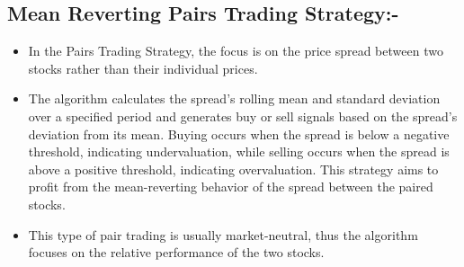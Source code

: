 \documentclass[11pt]{article}
\begin{document}
\subsection{Mean Reverting Pairs Trading Strategy:-}
\begin{itemize}
    \item In the Pairs Trading Strategy, the focus is on the price spread between two stocks rather than their individual prices.
    \item The algorithm calculates the spread's rolling mean and standard deviation over a specified period and generates buy or sell signals based on the spread's deviation from its mean. Buying occurs when the spread is below a negative threshold, indicating undervaluation, while selling occurs when the spread is above a positive threshold, indicating overvaluation. This strategy aims to profit from the mean-reverting behavior of the spread between the paired stocks.
    \item This type of pair trading is usually market-neutral, thus the algorithm focuses on the relative performance of the two stocks.
\end{itemize}
\end{document}
